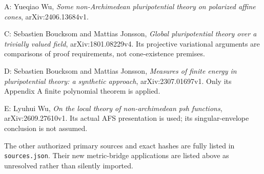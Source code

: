 \documentclass[
  10pt,
]{article}
\begin{document}
A: Yueqiao Wu, \emph{Some non-Archimedean pluripotential theory on
polarized affine cones}, arXiv:2406.13684v1.

C: Sebastien Boucksom and Mattias Jonsson, \emph{Global pluripotential
theory over a trivially valued field}, arXiv:1801.08229v4. Its
projective variational arguments are comparisons of proof requirements,
not cone-existence premises.

D: Sebastien Boucksom and Mattias Jonsson, \emph{Measures of finite
energy in pluripotential theory: a synthetic approach},
arXiv:2307.01697v1. Only its Appendix A finite polynomial theorem is
applied.

E: Lyuhui Wu, \emph{On the local theory of non-archimedean psh
functions}, arXiv:2609.27610v1. Its actual AFS presentation is used; its
singular-envelope conclusion is not assumed.

The other authorized primary sources and exact hashes are fully listed
in \texttt{sources.json}. Their new metric-bridge applications are
listed above as unresolved rather than silently imported.
\end{document}
